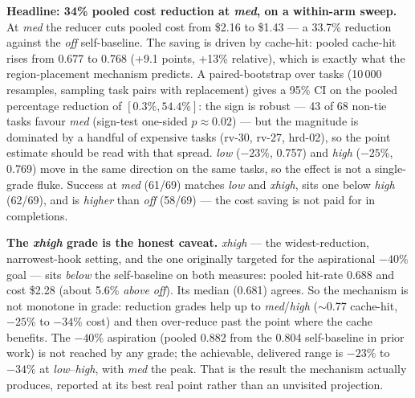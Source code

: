 \documentclass[11pt]{article}
\begin{document}
\textbf{Headline: 34\% pooled cost reduction at \emph{med}, on a within-arm sweep.} At \emph{med} the reducer cuts pooled cost from \$2.16 to \$1.43 --- a 33.7\% reduction against the \emph{off} self-baseline. The saving is driven by cache-hit: pooled cache-hit rises from 0.677 to 0.768 (+9.1 points, +13\% relative), which is exactly what the region-placement mechanism predicts. A paired-bootstrap over tasks (10\,000 resamples, sampling task pairs with replacement) gives a 95\% CI on the pooled percentage reduction of $[0.3\%, 54.4\%]$: the sign is robust --- 43 of 68 non-tie tasks favour \emph{med} (sign-test one-sided $p \approx 0.02$) --- but the magnitude is dominated by a handful of expensive tasks (rv-30, rv-27, hrd-02), so the point estimate should be read with that spread. \emph{low} ($-23\%$, 0.757) and \emph{high} ($-25\%$, 0.769) move in the same direction on the same tasks, so the effect is not a single-grade fluke. Success at \emph{med} (61/69) matches \emph{low} and \emph{xhigh}, sits one below \emph{high} (62/69), and is \emph{higher} than \emph{off} (58/69) --- the cost saving is not paid for in completions.

\textbf{The \emph{xhigh} grade is the honest caveat.} \emph{xhigh} --- the widest-reduction, narrowest-hook setting, and the one originally targeted for the aspirational $-40\%$ goal --- sits \emph{below} the self-baseline on both measures: pooled hit-rate 0.688 and cost \$2.28 (about 5.6\% \emph{above} \emph{off}). Its median (0.681) agrees. So the mechanism is not monotone in grade: reduction grades help up to \emph{med}/\emph{high} ($\sim$0.77 cache-hit, $-25\%$ to $-34\%$ cost) and then over-reduce past the point where the cache benefits. The $-40\%$ aspiration (pooled 0.882 from the 0.804 self-baseline in prior work) is not reached by any grade; the achievable, delivered range is $-23\%$ to $-34\%$ at \emph{low}--\emph{high}, with \emph{med} the peak. That is the result the mechanism actually produces, reported at its best real point rather than an unvisited projection.
\end{document}
